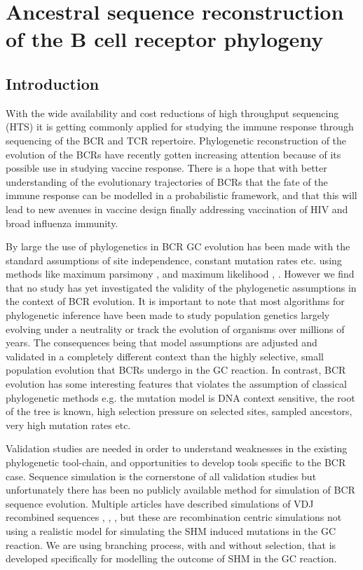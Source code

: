 \chapter{Ancestral sequence reconstruction of the B cell receptor phylogeny}

\section{Introduction}
With the wide availability and cost reductions of high throughput sequencing (HTS) it is getting commonly applied for studying the immune response through sequencing of the BCR and TCR repertoire.
Phylogenetic reconstruction of the evolution of the BCRs have recently gotten increasing attention because of its possible use in studying vaccine response.
There is a hope that with better understanding of the evolutionary trajectories of BCRs that the fate of the immune response can be modelled in a probabilistic framework, and that this will lead to new avenues in vaccine design finally addressing vaccination of HIV and broad influenza immunity.

By large the use of phylogenetics in BCR GC evolution has been made with the standard assumptions of site independence, constant mutation rates etc. using methods like maximum parsimony \cite{tas2016visualizing}, \cite{Barak2008-fw} and maximum likelihood \cite{Doria-Rose2014-vi}, \cite{Hoehn2016-wg}.
However we find that no study has yet investigated the validity of the phylogenetic assumptions in the context of BCR evolution.
It is important to note that most algorithms for phylogenetic inference have been made to study population genetics largely evolving under a neutrality or track the evolution of organisms over millions of years.
The consequences being that model assumptions are adjusted and validated in a completely different context than the highly selective, small population evolution that BCRs undergo in the GC reaction.
In contrast, BCR evolution has some interesting features that violates the assumption of classical phylogenetic methods e.g. the mutation model is DNA context sensitive, the root of the tree is known, high selection pressure on selected sites, sampled ancestors, very high mutation rates etc.

Validation studies are needed in order to understand weaknesses in the existing phylogenetic tool-chain, and opportunities to develop tools specific to the BCR case.
Sequence simulation is the cornerstone of all validation studies but unfortunately there has been no publicly available method for simulation of BCR sequence evolution.
Multiple articles have described simulations of VDJ recombined sequences \cite{safonova2015igsimulator}, \cite{ralph2016likelihood}, \cite{russ2015htjoinsolver}, but these are recombination centric simulations not using a realistic model for simulating the SHM induced mutations in the GC reaction.
We are using branching process, with and without selection, that is developed specifically for modelling the outcome of SHM in the GC reaction.

